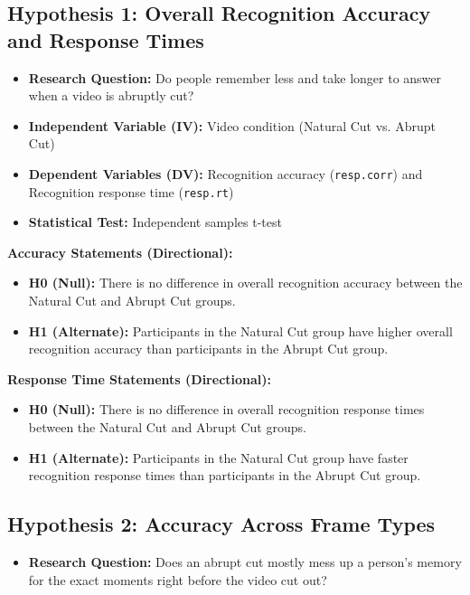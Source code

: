 \documentclass[10pt,a4paper]{article}
\begin{document}
\subsection{Hypothesis 1: Overall Recognition Accuracy and Response Times}
\begin{itemize}
    \item \textbf{Research Question:} Do people remember less and take longer to answer when a video is abruptly cut?
    \item \textbf{Independent Variable (IV):} Video condition (Natural Cut vs. Abrupt Cut)
    \item \textbf{Dependent Variables (DV):} Recognition accuracy (\texttt{resp.corr}) and Recognition response time (\texttt{resp.rt})
    \item \textbf{Statistical Test:} Independent samples t-test
\end{itemize}

\textbf{Accuracy Statements (Directional):}
\begin{itemize}
    \item \textbf{H0 (Null):} There is no difference in overall recognition accuracy between the Natural Cut and Abrupt Cut groups.
    \item \textbf{H1 (Alternate):} Participants in the Natural Cut group have higher overall recognition accuracy than participants in the Abrupt Cut group.
\end{itemize}

\textbf{Response Time Statements (Directional):}
\begin{itemize}
    \item \textbf{H0 (Null):} There is no difference in overall recognition response times between the Natural Cut and Abrupt Cut groups.
    \item \textbf{H1 (Alternate):} Participants in the Natural Cut group have faster recognition response times than participants in the Abrupt Cut group.
\end{itemize}

\subsection{Hypothesis 2: Accuracy Across Frame Types}
\begin{itemize}
    \item \textbf{Research Question:} Does an abrupt cut mostly mess up a person's memory for the exact moments right before the video cut out?
\end{itemize}
\end{document}
